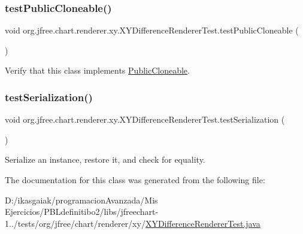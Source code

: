 \subsubsection{\texorpdfstring{test\+Public\+Cloneable()}{testPublicCloneable()}}
{\footnotesize\ttfamily void org.\+jfree.\+chart.\+renderer.\+xy.\+X\+Y\+Difference\+Renderer\+Test.\+test\+Public\+Cloneable (\begin{DoxyParamCaption}{ }\end{DoxyParamCaption})}

Verify that this class implements \mbox{\hyperlink{}{Public\+Cloneable}}. \mbox{\label{classorg_1_1jfree_1_1chart_1_1renderer_1_1xy_1_1_x_y_difference_renderer_test_abf21cd7ea99dca3a72463e611cf0b636}} 
\subsubsection{\texorpdfstring{test\+Serialization()}{testSerialization()}}
{\footnotesize\ttfamily void org.\+jfree.\+chart.\+renderer.\+xy.\+X\+Y\+Difference\+Renderer\+Test.\+test\+Serialization (\begin{DoxyParamCaption}{ }\end{DoxyParamCaption})}

Serialize an instance, restore it, and check for equality. 

The documentation for this class was generated from the following file\+:\begin{DoxyCompactItemize}
\item 
D\+:/ikasgaiak/programacion\+Avanzada/\+Mis Ejercicios/\+P\+B\+Ldefinitibo2/libs/jfreechart-\/1../tests/org/jfree/chart/renderer/xy/\mbox{\hyperlink{_x_y_difference_renderer_test_8java}{X\+Y\+Difference\+Renderer\+Test.\+java}}\end{DoxyCompactItemize}

